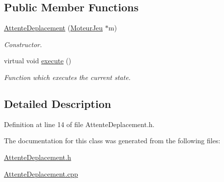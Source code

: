 \subsection*{Public Member Functions}
\begin{DoxyCompactItemize}
\item 
\hypertarget{class_attente_deplacement_aaae432cdf1d841e8c5b8ac8f5f61abcc}{
\hyperlink{class_attente_deplacement_aaae432cdf1d841e8c5b8ac8f5f61abcc}{AttenteDeplacement} (\hyperlink{class_moteur_jeu}{MoteurJeu} $\ast$m)}
\label{class_attente_deplacement_aaae432cdf1d841e8c5b8ac8f5f61abcc}

\begin{DoxyCompactList}\small\item\em Constructor. \item\end{DoxyCompactList}\item 
\hypertarget{class_attente_deplacement_ac524e34a91424ec82247a95006158dd1}{
virtual void \hyperlink{class_attente_deplacement_ac524e34a91424ec82247a95006158dd1}{execute} ()}
\label{class_attente_deplacement_ac524e34a91424ec82247a95006158dd1}

\begin{DoxyCompactList}\small\item\em Function which executes the current state. \item\end{DoxyCompactList}\end{DoxyCompactItemize}


\subsection{Detailed Description}


Definition at line 14 of file AttenteDeplacement.h.



The documentation for this class was generated from the following files:\begin{DoxyCompactItemize}
\item 
\hyperlink{_attente_deplacement_8h}{AttenteDeplacement.h}\item 
\hyperlink{_attente_deplacement_8cpp}{AttenteDeplacement.cpp}\end{DoxyCompactItemize}
